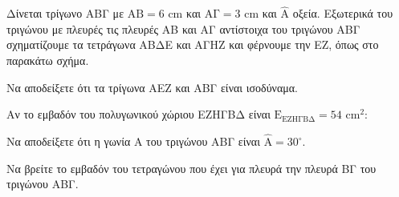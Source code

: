 Δίνεται τρίγωνο ΑΒΓ με $\mathrm{AB} = 6 \text{ cm}$ και $\mathrm{A\Gamma} = 3 \text{ cm}$ και $\hat{\mathrm{A}}$ οξεία. Εξωτερικά του τριγώνου με πλευρές τις πλευρές ΑΒ και ΑΓ αντίστοιχα του τριγώνου ΑΒΓ σχηματίζουμε τα τετράγωνα ΑΒΔΕ και ΑΓΗΖ και φέρνουμε την ΕΖ, όπως στο παρακάτω σχήμα.
\begin{alist}
    \item Να αποδείξετε ότι τα τρίγωνα ΑΕΖ και ΑΒΓ είναι ισοδύναμα. 
    \item Αν το εμβαδόν του πολυγωνικού χώριου ΕΖΗΓΒΔ είναι $\mathrm{E}_{\mathrm{EZH\Gamma B\Delta}}=54 \text{ cm}^2$:
    \begin{rlist}
        \item Να αποδείξετε ότι η γωνία Α του τριγώνου ΑΒΓ είναι $\hat{\mathrm{A}}=30^{\circ}$. 
        \item Να βρείτε το εμβαδόν του τετραγώνου που έχει για πλευρά την πλευρά ΒΓ του τριγώνου ΑΒΓ. 
    \end{rlist}
\end{alist}